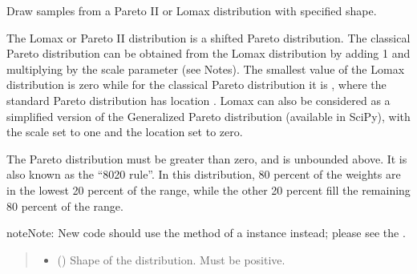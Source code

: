 \documentclass[letterpaper,10pt,english]{sphinxmanual}
\begin{document}
\begin{fulllineitems}
\label{\detokenize{metilda.controllers:metilda.controllers.pitch_art_wizard.pareto}}
\pysigstartsignatures
{}
\pysigstopsignatures
\sphinxAtStartPar
Draw samples from a Pareto II or Lomax distribution with
specified shape.

\sphinxAtStartPar
The Lomax or Pareto II distribution is a shifted Pareto
distribution. The classical Pareto distribution can be
obtained from the Lomax distribution by adding 1 and
multiplying by the scale parameter  (see Notes).  The
smallest value of the Lomax distribution is zero while for the
classical Pareto distribution it is , where the standard
Pareto distribution has location .  Lomax can also
be considered as a simplified version of the Generalized
Pareto distribution (available in SciPy), with the scale set
to one and the location set to zero.

\sphinxAtStartPar
The Pareto distribution must be greater than zero, and is
unbounded above.  It is also known as the “80\sphinxhyphen{}20 rule”.  In
this distribution, 80 percent of the weights are in the lowest
20 percent of the range, while the other 20 percent fill the
remaining 80 percent of the range.

\begin{sphinxadmonition}{note}{Note:}
\sphinxAtStartPar
New code should use the 
method of a  instance instead;
please see the .
\end{sphinxadmonition}
\begin{quote}\begin{description}
\begin{itemize}
\item {} 
\sphinxAtStartPar
{} () \textendash{} Shape of the distribution. Must be positive.


\end{itemize}
\end{description}
\end{quote}
\end{fulllineitems}
\end{document}
